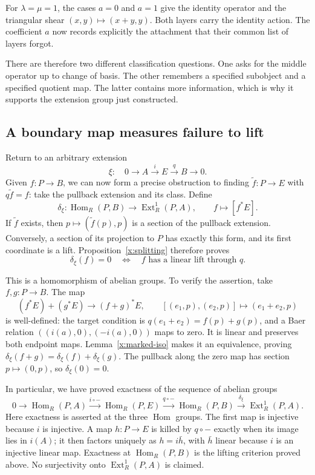 \documentclass[11pt]{article}
\theoremstyle{definition}
\theoremstyle{remark}\newtheorem{remark}[theorem]{Remark}
\DeclareMathOperator{\Hom}{Hom}
\DeclareMathOperator{\Ext}{Ext}
\begin{document}
For $\lambda=\mu=1$, the cases $a=0$ and $a=1$ give the identity
operator and the triangular shear $(x,y)\mapsto(x+y,y)$. Both layers carry the
identity action. The coefficient $a$ now records explicitly the
attachment that their common list of layers forgot.

There are therefore two different classification questions. One asks
for the middle operator up to change of basis. The other remembers a
specified subobject and a specified quotient map. The latter contains
more information, which is why it supports the extension group just
constructed.

\subsection{A boundary map measures failure to lift}\label{x:obstruction}

Return to an arbitrary extension
\[
\xi:\quad0\longrightarrow A\xrightarrow{i}E\xrightarrow{q}B
\longrightarrow0.
\]
Given $f:P\to B$, we can now form a precise obstruction to finding
$\widetilde f:P\to E$ with $q\widetilde f=f$: take the pullback
extension and its class. Define
\[
\delta_\xi:\Hom_R(P,B)\longrightarrow\Ext^1_R(P,A),
\qquad f\longmapsto[f^*E].
\]
If $\widetilde f$ exists, then $p\mapsto(\widetilde f(p),p)$ is a
section of the pullback extension. Conversely, a section of its
projection to $P$ has exactly this form, and its first coordinate is
a lift. Proposition~\ref{x:splitting} therefore proves
\[
\delta_\xi(f)=0
\quad\Longleftrightarrow\quad
f\text{ has a linear lift through }q.
\]

This is a homomorphism of abelian groups. To verify the assertion,
take $f,g:P\to B$. The map
\[
(f^*E)+(g^*E)\longrightarrow(f+g)^*E,
\qquad[(e_1,p),(e_2,p)]\longmapsto(e_1+e_2,p)
\]
is well-defined: the target condition is
$q(e_1+e_2)=f(p)+g(p)$, and a Baer relation
$((i(a),0),(-i(a),0))$ maps to zero. It is linear and preserves both
endpoint maps. Lemma~\ref{x:marked-iso} makes it an equivalence, proving
$\delta_\xi(f+g)=\delta_\xi(f)+\delta_\xi(g)$. The pullback along
the zero map has section $p\mapsto(0,p)$, so $\delta_\xi(0)=0$.

In particular, we have proved exactness of the sequence of abelian groups
\[
0\longrightarrow\Hom_R(P,A)\xrightarrow{i\circ-}\Hom_R(P,E)
\xrightarrow{q\circ-}\Hom_R(P,B)
\xrightarrow{\delta_\xi}\Ext^1_R(P,A).
\]
Here exactness is asserted at the three $\Hom$ groups. The first map
is injective because $i$ is injective. A map $h:P\to E$ is killed by
$q\circ-$ exactly when its image lies in $i(A)$; it then factors
uniquely as $h=i\bar h$, with $\bar h$ linear because $i$ is an
injective linear map. Exactness at $\Hom_R(P,B)$ is the lifting
criterion proved above. No surjectivity onto $\Ext^1_R(P,A)$ is claimed.
\end{document}
